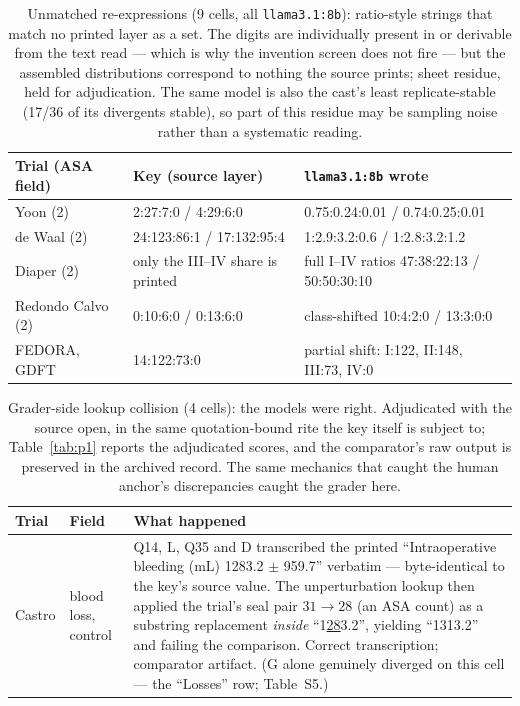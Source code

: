 \documentclass[11pt]{article}
\begin{document}
\begin{table}[H]
\centering\footnotesize
\caption{Unmatched re-expressions (9 cells, all \texttt{llama3.1:8b}): ratio-style strings that match no printed layer as a set. The digits are individually present in or derivable from the text read --- which is why the invention screen does not fire --- but the assembled distributions correspond to nothing the source prints; sheet residue, held for adjudication. The same model is also the cast's least replicate-stable (17/36 of its divergents stable), so part of this residue may be sampling noise rather than a systematic reading.}
\setlength{\tabcolsep}{4pt}
\begin{tabular}{p{3.2cm}p{4.6cm}p{6.2cm}}
\toprule
Trial (ASA field) & Key (source layer) & \texttt{llama3.1:8b} wrote \\
\midrule
Yoon (2) & 2:27:7:0 / 4:29:6:0 & 0.75:0.24:0.01 / 0.74:0.25:0.01 \\
de Waal (2) & 24:123:86:1 / 17:132:95:4 & 1:2.9:3.2:0.6 / 1:2.8:3.2:1.2 \\
Diaper (2) & only the III--IV share is printed & full I--IV ratios 47:38:22:13 / 50:50:30:10 \\
Redondo Calvo (2) & 0:10:6:0 / 0:13:6:0 & class-shifted 10:4:2:0 / 13:3:0:0 \\
FEDORA, GDFT & 14:122:73:0 & partial shift: I:122, II:148, III:73, IV:0 \\
\bottomrule
\end{tabular}
\end{table}

\begin{table}[H]
\centering\footnotesize
\caption{Grader-side lookup collision (4 cells): the models were right. Adjudicated with the source open, in the same quotation-bound rite the key itself is subject to; Table~\ref{tab:p1} reports the adjudicated scores, and the comparator's raw output is preserved in the archived record. The same mechanics that caught the human anchor's discrepancies caught the grader here.}
\setlength{\tabcolsep}{4pt}
\begin{tabular}{p{2.0cm}p{2.6cm}p{9.6cm}}
\toprule
Trial & Field & What happened \\
\midrule
Castro & blood loss, control & Q14, L, Q35 and D transcribed the printed ``Intraoperative bleeding (mL) 1283.2 $\pm$ 959.7'' verbatim --- byte-identical to the key's source value. The unperturbation lookup then applied the trial's seal pair $31 \rightarrow 28$ (an ASA count) as a substring replacement \emph{inside} ``1\underline{28}3.2'', yielding ``1313.2'' and failing the comparison. Correct transcription; comparator artifact. (G alone genuinely diverged on this cell --- the ``Losses'' row; Table~S5.) \\
\bottomrule
\end{tabular}
\end{table}
\end{document}
